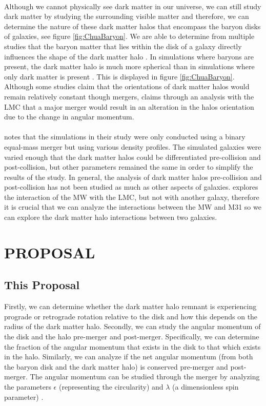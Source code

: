 \documentclass[linenumbers,trackchanges]{aastex7}
\begin{document}
\paragraph{} Although we cannot physically see dark matter in our universe, we can still study dark matter by studying the surrounding visible matter and therefore, we can determine the nature of these dark matter halos that encompass the baryon disks of galaxies, see figure \ref{fig:ChuaBaryon}. We are able to determine from multiple studies that the baryon matter that lies within the disk of a galaxy directly influences the shape of the dark matter halo \citep{Prada+2019}. In simulations where baryons are present, the dark matter halo is much more spherical than in simulations where only dark matter is present \citep{Chua+2019}. This is displayed in figure \ref{fig:ChuaBaryon}. Although some studies claim that the orientations of dark matter halos would remain relatively constant though mergers, \cite{Baptista+2023} claims through an analysis with the LMC that a major merger would result in an alteration in the halos orientation due to the change in angular momentum.

\paragraph{} \cite{Drakos+2019} notes that the simulations in their study were only conducted using a binary equal-mass merger but using various density profiles. The simulated galaxies were varied enough that the dark matter halos could be differentiated pre-collision and post-collision, but other parameters remained the same in order to simplify the results of the study. In general, the analysis of dark matter halos pre-collision and post-collision has not been studied as much as other aspects of galaxies. \cite{Baptista+2023} explores the interaction of the MW with the LMC, but not with another galaxy, therefore it is crucial that we can analyze the interactions between the MW and M31 so we can explore the dark matter halo interactions between two galaxies.

\section{PROPOSAL}

\subsection{This Proposal} Firstly, we can determine whether the dark matter halo remnant is experiencing prograde or retrograde rotation relative to the disk and how this depends on the radius of the dark matter halo. Secondly, we can study the angular momentum of the disk and the halo pre-merger and post-merger. Specifically, we can determine the fraction of the angular momentum that exists in the disk to that which exists in the halo. Similarly, we can analyze if the net angular momentum (from both the baryon disk and the dark matter halo) is conserved pre-merger and post-merger. The angular momentum can be studied through the merger by analyzing the parameters $\epsilon$ (representing the circularity) and $\lambda$ (a dimensionless spin parameter) \citep{Drakos+2019}.
\end{document}
